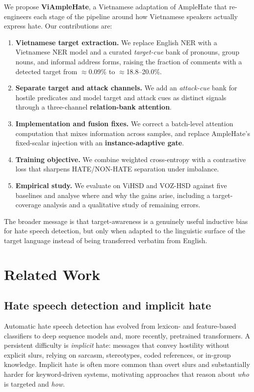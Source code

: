 \documentclass[11pt]{article}
\begin{document}
We propose \textbf{ViAmpleHate}, a Vietnamese adaptation of AmpleHate that re-engineers each stage of the pipeline around how Vietnamese speakers actually express hate. Our contributions are:
\begin{enumerate}
  \item \textbf{Vietnamese target extraction.} We replace English NER with a Vietnamese NER model and a curated \emph{target-cue} bank of pronouns, group nouns, and informal address forms, raising the fraction of comments with a detected target from $\approx$0.09\% to $\approx$18.8--20.0\%.
  \item \textbf{Separate target and attack channels.} We add an \emph{attack-cue} bank for hostile predicates and model target and attack cues as distinct signals through a three-channel \textbf{relation-bank attention}.
  \item \textbf{Implementation and fusion fixes.} We correct a batch-level attention computation that mixes information across samples, and replace AmpleHate's fixed-scalar injection with an \textbf{instance-adaptive gate}.
  \item \textbf{Training objective.} We combine weighted cross-entropy with a contrastive loss that sharpens HATE/NON-HATE separation under imbalance.
  \item \textbf{Empirical study.} We evaluate on ViHSD and VOZ-HSD against five baselines and analyse where and why the gains arise, including a target-coverage analysis and a qualitative study of remaining errors.
\end{enumerate}
The broader message is that target-awareness is a genuinely useful inductive bias for hate speech detection, but only when adapted to the linguistic surface of the target language instead of being transferred verbatim from English.

\section{Related Work}

\subsection{Hate speech detection and implicit hate}
Automatic hate speech detection has evolved from lexicon- and feature-based classifiers to deep sequence models and, more recently, pretrained transformers. A persistent difficulty is \emph{implicit} hate: messages that convey hostility without explicit slurs, relying on sarcasm, stereotypes, coded references, or in-group knowledge. Implicit hate is often more common than overt slurs and substantially harder for keyword-driven systems, motivating approaches that reason about \emph{who} is targeted and \emph{how}.
\end{document}
